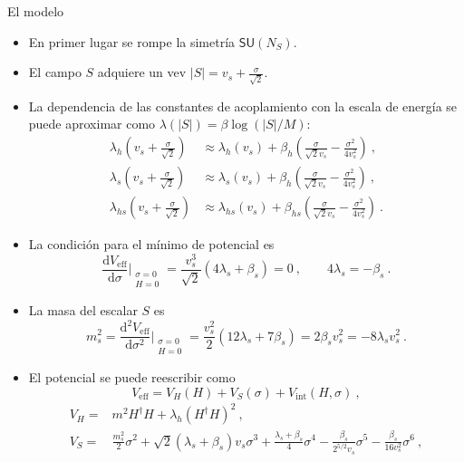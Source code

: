 \documentclass{beamer}
\newcommand{\dif}{\mathrm{d}}
\begin{document}
\begin{frame}{El modelo}
\begin{itemize}
\item<only@2> En primer lugar se rompe la simetría $\mathsf{SU}(N_S)$.
\item<only@2> El campo $S$ adquiere un vev $|S| = v_s + \frac{\sigma}{\sqrt{2}}$.
\item<only@2> La dependencia de las constantes de acoplamiento con la escala de energía se puede aproximar como $\lambda(|S|) = \beta \log(|S|/M)$:
\begin{subequations}
\begin{align}
\lambda_h\left(v_s + \frac{\sigma}{\sqrt{2}}\right) &\approx \lambda_h(v_s) + \beta_h \left(\frac{\sigma}{\sqrt{2}v_s}-\frac{\sigma^2}{4 v_s^2}\right)\ ,\\
\lambda_s\left(v_s + \frac{\sigma}{\sqrt{2}}\right) &\approx \lambda_s(v_s) + \beta_h \left(\frac{\sigma}{\sqrt{2}v_s}-\frac{\sigma^2}{4 v_s^2}\right)\ ,\\
\lambda_{hs}\left(v_s + \frac{\sigma}{\sqrt{2}}\right) &\approx \lambda_{hs}(v_s) + \beta_{hs} \left(\frac{\sigma}{\sqrt{2}v_s}-\frac{\sigma^2}{4 v_s^2}\right)\ .
\end{align}
\end{subequations}
\item<only@3> La condición para el mínimo de potencial es
\begin{equation}
\frac{\dif V_\mathrm{eff}}{\dif \sigma}\Big|_{\substack{\sigma=0\\ H=0}} = \frac{v_s^3}{\sqrt{2}}(4\lambda_s + \beta_s) = 0\ ,  \qquad 4\lambda_s = - \beta_s \ . \label{eq:minimum}
\end{equation}
\item<only@3> La masa del escalar $S$ es 
\begin{equation}
m_s^2 = \frac{\dif^2 V_\mathrm{eff}}{\dif \sigma^2}\Big|_{\substack{\sigma=0\\ H=0}} \! =\frac{v_s^2}{2} (12 \lambda_s +7\beta_s) =2\beta_s v_s^2 = -8 \lambda_s v_s^2\ .
\end{equation}
\item<only@4> El potencial se puede reescribir como
\begin{equation}
V_\mathrm{eff} = V_H (H) + V_S (\sigma) + V_\mathrm{int}(H, \sigma)\ ,
\end{equation}
\begin{subequations}
\begin{align}
V_H =& m^2 H^\dagger H + \lambda_h (H^\dagger H)^2\label{eq:quadraticCW}\ , \\
V_S =& \frac{m_s^2}{2} \sigma^2 + \sqrt{2}(\lambda_s \!\!+\!\!\beta_s)v_s \sigma^3 + \frac{\lambda_s \!\!+\!\!\beta_s}{4}\sigma^4 - \frac{\beta_s}{2^{5/2} v_s}\sigma^5 - \frac{\beta_s}{16 v_s^2}\sigma^6\  \label{eq:Spotential},\\

\end{align}
\end{subequations}
\end{itemize}
\end{frame}
\end{document}
